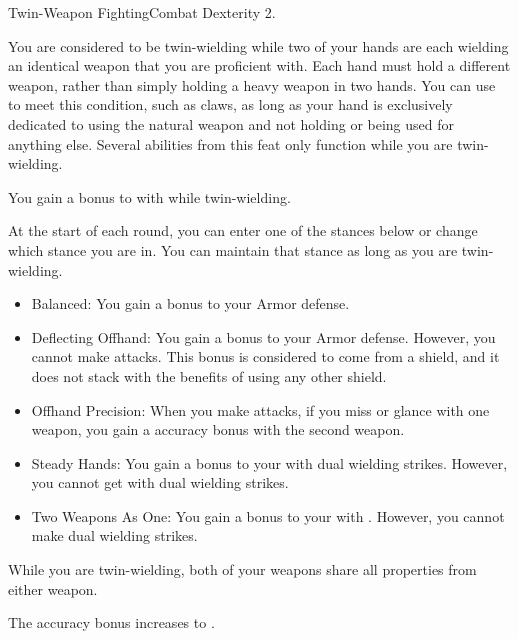     \begin{feat}{Twin-Weapon Fighting}{Combat}
        \featpre Dexterity 2.

         You are considered to be twin-wielding while two of your hands are each wielding an identical weapon that you are proficient with.
        Each hand must hold a different weapon, rather than simply holding a heavy weapon in two hands.
        You can use  to meet this condition, such as claws, as long as your hand is exclusively dedicated to using the natural weapon and not holding or being used for anything else.
        Several abilities from this feat only function while you are twin-wielding.

         You gain a  bonus to  with  while twin-wielding.

         At the start of each round, you can enter one of the stances below or change which stance you are in.
        You can maintain that stance as long as you are twin-wielding.
        \begin{itemize}
            \item Balanced: You gain a  bonus to your Armor defense.
            \item Deflecting Offhand: You gain a  bonus to your Armor defense.
                However, you cannot make  attacks.
                This bonus is considered to come from a shield, and it does not stack with the benefits of using any other shield.
            \item Offhand Precision: When you make  attacks, if you miss or glance with one weapon, you gain a  accuracy bonus with the second weapon.
            \item Steady Hands: You gain a  bonus to your  with dual wielding strikes.
                However, you cannot get  with dual wielding strikes.
            \item Two Weapons As One: You gain a  bonus to your  with .
                However, you cannot make dual wielding strikes.
        \end{itemize}

         While you are twin-wielding, both of your weapons share all \magical properties from either weapon.

         The accuracy bonus increases to .
    \end{feat}


